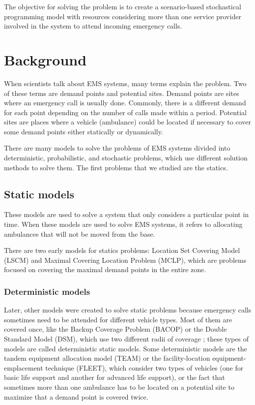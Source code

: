 The objective for solving the problem is to create a scenario-based stochastical programming model with resources considering more than one service provider in\-vol\-ved in the system to attend incoming emergency calls. 


\chapter{Background}\label{cap:back}

When scientists talk about EMS systems, many terms explain the problem. Two of these terms are demand points and potential sites. Demand points are sites where an emergency call is usually done. Commonly, there is a different demand for each point depending on the number of calls made within a period. Potential sites are places where a vehicle (ambulance) could be located if necessary to cover some demand points either statically or dynamically.

There are many models to solve the problems of EMS systems divided into deterministic, probabilistic, and stochastic problems, which use different solution methods to solve them. The first problems that we studied are the statics. 

\section{Static models}

These models are used to solve a system that only considers a particular point in time. When these models are used to solve EMS systems, it refers to allocating ambulances that will not be moved from the base. 

There are two early models for statics problems: Location Set Covering Model (LSCM) and Maximal Covering Location Problem (MCLP), which are problems focused on covering the maximal demand points in the entire zone.



\subsection{Deterministic models}

Later, other models were created to solve static problems because emergency calls sometimes need to be attended for different vehicle types. Most of them are covered once, like the Backup Coverage Problem (BACOP) or the Double Standard Model (DSM), which use two different radii of coverage \cite{li2011covering}; these types of models are called deterministic static models. Some deterministic models are the tandem equipment allocation model (TEAM) or the facility-location equipment-emplacement technique (FLEET), which consider two types of vehicles (one for basic life support and another for advanced life support), or the fact that sometimes more than one ambulance has to be located on a potential site to maximize that a demand point is covered twice. 

